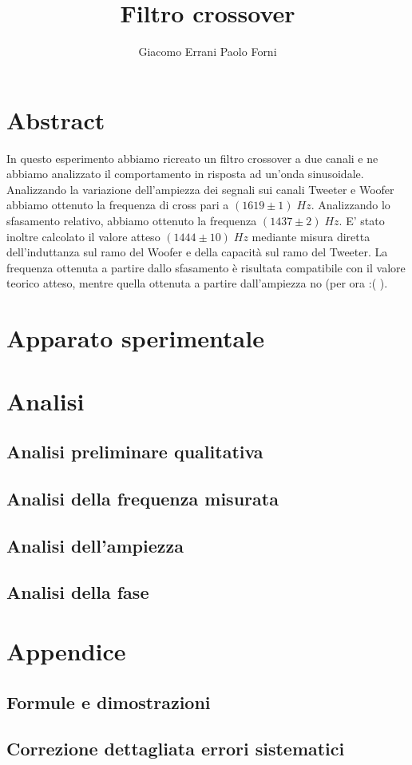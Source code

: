 \documentclass[12pt,a4paper]{article}
\title{Filtro crossover} %
\date{}
\author{Giacomo Errani Paolo Forni}
\begin{document}
\newcommand{\theoryF}{ $(1444 \pm 10) \; Hz $}
\newcommand{\amplitudeF}{$(1619 \pm 1) \; Hz $}
\newcommand{\phaseF}{$(1437 \pm 2) \; Hz $}

\maketitle

\section{Abstract}
In questo esperimento abbiamo ricreato un filtro crossover a due canali e ne abbiamo analizzato il comportamento in risposta ad un'onda sinusoidale. Analizzando la variazione dell'ampiezza dei segnali sui canali Tweeter e Woofer abbiamo ottenuto la frequenza di cross pari a \amplitudeF. Analizzando lo sfasamento relativo, abbiamo ottenuto la frequenza \phaseF. E' stato inoltre calcolato il valore atteso \theoryF \hspace{1pt} mediante misura diretta dell'induttanza sul ramo del Woofer e della capacità sul ramo del Tweeter. 
\newline
La frequenza ottenuta a partire dallo sfasamento è risultata compatibile con il valore teorico atteso, mentre quella ottenuta a partire dall'ampiezza no (per ora :( ).
\section{Apparato sperimentale}

\section{Analisi}

\subsection{Analisi preliminare qualitativa}

\subsection{Analisi della frequenza misurata}

\subsection{Analisi dell'ampiezza}

\subsection{Analisi della fase}

\section{Appendice}

\subsection{Formule e dimostrazioni}

\subsection{Correzione dettagliata errori sistematici}
\end{document}
